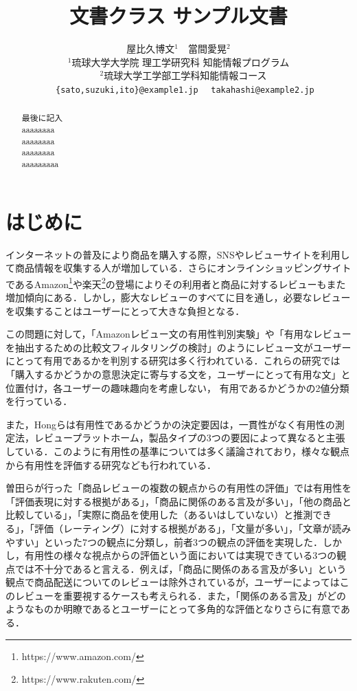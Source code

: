 \documentclass[
  platex, dvipdfmx,  %
]{nlp2024}
\title{\pkg{NLP2024}文書クラス サンプル文書}
\author{%
  屋比久博文${}^{1}$　當間愛晃${}^{2}$　\\
${}^{1}$琉球大学大学院 理工学研究科 知能情報プログラム\\
　${}^{2}$琉球大学工学部工学科知能情報コース\\
　 \texttt{\{sato,suzuki,ito\}@example1.jp}
　\texttt{takahashi@example2.jp}\\}
\begin{document}
\maketitle
\begin{abstract}
最後に記入\\
aaaaaaaa\\
aaaaaaaa\\
aaaaaaaa\\
aaaaaaaaa\\
\end{abstract}

\section{はじめに}
インターネットの普及により商品を購入する際，SNSやレビューサイトを利用して商品情報を収集する人が増加している．さらにオンラインショッピングサイトであるAmazon\footnote{https://www.amazon.com/}や楽天\footnote{https://www.rakuten.com/}の登場によりその利用者と商品に対するレビューもまた増加傾向にある．しかし，膨大なレビューのすべてに目を通し，必要なレビューを収集することはユーザーにとって大きな負担となる．

この問題に対して，「Amazonレビュー文の有用性判別実験\cite{Article_02}」や「有用なレビューを抽出するための比較文フィルタリングの検討\cite{Article_03}」のようにレビュー文がユーザーにとって有用であるかを判別する研究は多く行われている．これらの研究では「購入するかどうかの意思決定に寄与する文を，ユーザーにとって有用な文」と位置付け，各ユーザーの趣味趣向を考慮しない，
有用であるかどうかの2値分類を行っている．

また，Hongらは有用性であるかどうかの決定要因は，一貫性がなく有用性の測定法，レビュープラットホーム，製品タイプの3つの要因によって異なると主張している\cite{Article_04}．このように有用性の基準については多く議論されており，様々な観点から有用性を評価する研究なども行われている．

曽田らが行った「商品レビューの複数の観点からの有用性の評価\cite{Article_05}」では有用性を「評価表現に対する根拠がある」，「商品に関係のある言及が多い」，「他の商品と比較している」，「実際に商品を使用した（あるいはしていない）と推測できる」，「評価（レーティング）に対する根拠がある」，「文量が多い」，「文章が読みやすい」といった7つの観点に分類し，前者3つの観点の評価を実現した．しかし，有用性の様々な視点からの評価という面においては実現できている3つの観点では不十分であると言える．例えば，「商品に関係のある言及が多い」という観点で商品配送についてのレビューは除外されているが，ユーザーによってはこのレビューを重要視するケースも考えられる．また，「関係のある言及」がどのようなものか明瞭であるとユーザーにとって多角的な評価となりさらに有意である．
\end{document}
